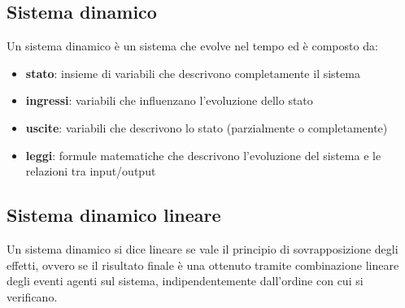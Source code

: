 \subsection{Sistema dinamico}
Un sistema dinamico è un sistema che evolve nel tempo ed è composto da:
\begin{itemize}
	\item \textbf{stato}: insieme di variabili che descrivono completamente il sistema
	\item \textbf{ingressi}: variabili che influenzano l'evoluzione dello stato
	\item \textbf{uscite}: variabili che descrivono lo stato (parzialmente o completamente)
	\item \textbf{leggi}: formule matematiche che descrivono l'evoluzione del sistema e le relazioni tra input/output
\end{itemize}

\subsection{Sistema dinamico lineare}
Un sistema dinamico si dice lineare se vale il principio di sovrapposizione degli effetti, ovvero se il risultato finale è una
ottenuto tramite combinazione lineare degli eventi agenti sul sistema, indipendentemente dall'ordine con cui si verificano.
